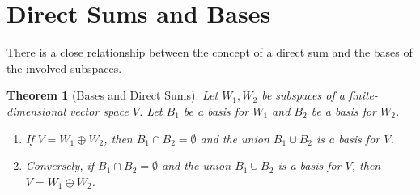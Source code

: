 \documentclass[11pt]{article}
\newtheorem{theorem}{Theorem}[section]
\theoremstyle{definition}
\theoremstyle{remark}
\newcommand{\intersect}{\cap}
\newcommand{\union}{\cup}
\newcommand{\directsum}{\oplus}
\newcommand{\emptysetset}{\emptyset}
\begin{document}
\section{Direct Sums and Bases}

There is a close relationship between the concept of a direct sum and the bases of the involved subspaces.

\begin{theorem}[Bases and Direct Sums]
Let $W_1, W_2$ be subspaces of a finite-dimensional vector space $V$. Let $B_1$ be a basis for $W_1$ and $B_2$ be a basis for $W_2$.
\begin{enumerate}
    \item If $V = W_1 \directsum W_2$, then $B_1 \intersect B_2 = \emptysetset$ and the union $B_1 \union B_2$ is a basis for $V$.
    \item Conversely, if $B_1 \intersect B_2 = \emptysetset$ and the union $B_1 \union B_2$ is a basis for $V$, then $V = W_1 \directsum W_2$.
\end{enumerate}
\end{theorem}
\end{document}
